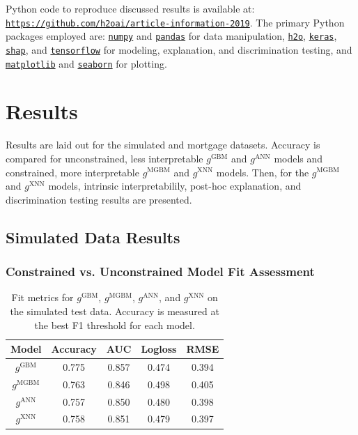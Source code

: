 \documentclass[information,article,submit,moreauthors,pdftex]{definitions/mdpi}
\begin{document}
Python code to reproduce discussed results is available at: \texttt{\url{https://github.com/h2oai/article-information-2019}}. The primary Python packages employed are: \href{https://numpy.org/}{\texttt{numpy}} and \href{https://pandas.pydata.org/}{\texttt{pandas}} for data manipulation, \href{https://github.com/h2oai/h2o-3}{\texttt{h2o}}, \href{https://keras.io/}{\texttt{keras}}, \href{https://github.com/slundberg/shap}{\texttt{shap}}, and \href{https://www.tensorflow.org/}{\texttt{tensorflow}} for modeling, explanation, and discrimination testing, and \href{https://matplotlib.org/}{\texttt{matplotlib}} and \href{https://seaborn.pydata.org/}{\texttt{seaborn}} for plotting. 

\section{Results}\label{sec:res}

Results are laid out for the simulated and mortgage datasets. Accuracy is compared for unconstrained, less interpretable $g^{\text{GBM}}$ and $g^{\text{ANN}}$ models and constrained, more interpretable $g^{\text{MGBM}}$ and $g^{\text{XNN}}$ models. Then, for the  $g^{\text{MGBM}}$ and $g^{\text{XNN}}$ models, intrinsic interpretabilily, post-hoc explanation, and discrimination testing results are presented.

\subsection{Simulated Data Results}

\subsubsection{Constrained vs. Unconstrained Model Fit Assessment}

\begin{table}[H]
\label{tab:sim_acc}
\caption{Fit metrics for $g^\text{GBM}$, $g^\text{MGBM}$, $g^\text{ANN}$, and $g^\text{XNN}$ on the simulated test data. Accuracy is measured at the best F1 threshold for each model.}
\centering
\begin{tabular}{ccccc}
\toprule
\textbf{Model}		& \textbf{Accuracy}	& \textbf{AUC}	 & \textbf{Logloss}	& \textbf{RMSE}\\
\midrule
$g^\text{GBM}$		& 0.775	& 0.857	& 0.474	& 0.394 \\
$g^\text{MGBM}$	& 0.763	& 0.846	& 0.498	& 0.405 \\
$g^\text{ANN}$		& 0.757	& 0.850	& 0.480 	& 0.398 \\
$g^\text{XNN}$		& 0.758	& 0.851	& 0.479	& 0.397 \\
\bottomrule
\end{tabular}
\end{table}
\end{document}
